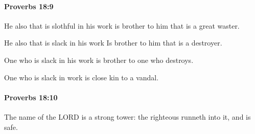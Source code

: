 		\paragraph{Proverbs 18:9} %
			\label{PROVERBS-18-9}

			He also that is slothful in his work is brother to him that is a great waster.

			\begin{versebox}
					\item[BHS] 
					\item[ASV] He also that is slack in his work Is brother to him that is a destroyer.
					\item[NIV] One who is slack in his work is brother to one who destroys.
					\item[NRSV] One who is slack in work is close kin to a vandal.
			\end{versebox}

		\paragraph{Proverbs 18:10} %
			\label{PROVERBS-18-10}

			The name of the LORD is a strong tower: the righteous runneth into it, and is safe.

